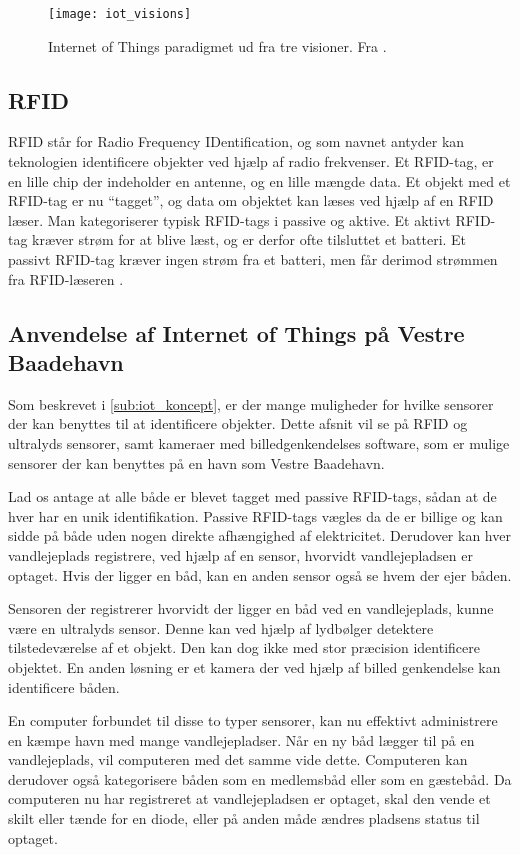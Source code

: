 \begin{figure}
  \centering
  \texttt{[image: iot\_visions]}
  \caption{Internet of Things paradigmet ud fra tre visioner. Fra \cite{iot_survey_2010}.}
  \label{fig:iot_visions}
\end{figure}

\subsection{RFID}
RFID står for Radio Frequency IDentification, og som navnet antyder kan teknologien identificere objekter ved hjælp af radio frekvenser. Et RFID-tag, er en lille chip der indeholder en antenne, og en lille mængde data. Et objekt med et RFID-tag er nu \enquote{tagget}, og data om objektet kan læses ved hjælp af en RFID læser. Man kategoriserer typisk RFID-tags i passive og aktive. Et aktivt RFID-tag kræver strøm for at blive læst, og er derfor ofte tilsluttet et batteri. Et passivt RFID-tag kræver ingen strøm fra et batteri, men får derimod strømmen fra RFID-læseren \cite{want2006rfid}.

\subsection{Anvendelse af Internet of Things på Vestre Baadehavn}
\label{sub:iot_vestre_baadehavn}

Som beskrevet i \cref{sub:iot_koncept}, er der mange muligheder for hvilke sensorer der kan benyttes til at identificere objekter. Dette afsnit vil se på RFID og ultralyds sensorer, samt kameraer med billedgenkendelses software, som er mulige sensorer der kan benyttes på en havn som Vestre Baadehavn.

Lad os antage at alle både er blevet tagget med passive RFID-tags, sådan at de hver har en unik identifikation. Passive RFID-tags vægles da de er billige og kan sidde på både uden nogen direkte afhængighed af elektricitet. Derudover kan hver vandlejeplads registrere, ved hjælp af en sensor, hvorvidt vandlejepladsen er optaget. Hvis der ligger en båd, kan en anden sensor også se hvem der ejer båden.

Sensoren der registrerer hvorvidt der ligger en båd ved en vandlejeplads, kunne være en ultralyds sensor. Denne kan ved hjælp af lydbølger detektere tilstedeværelse af et objekt. Den kan dog ikke med stor præcision identificere objektet. En anden løsning er et kamera der ved hjælp af billed genkendelse kan identificere båden.

En computer forbundet til disse to typer sensorer, kan nu effektivt administrere en kæmpe havn med mange vandlejepladser. Når en ny båd lægger til på en vandlejeplads, vil computeren med det samme vide dette. Computeren kan derudover også kategorisere båden som en medlemsbåd eller som en gæstebåd. Da computeren nu har registreret at vandlejepladsen er optaget, skal den vende et skilt eller tænde for en diode, eller på anden måde ændres pladsens status til optaget.


